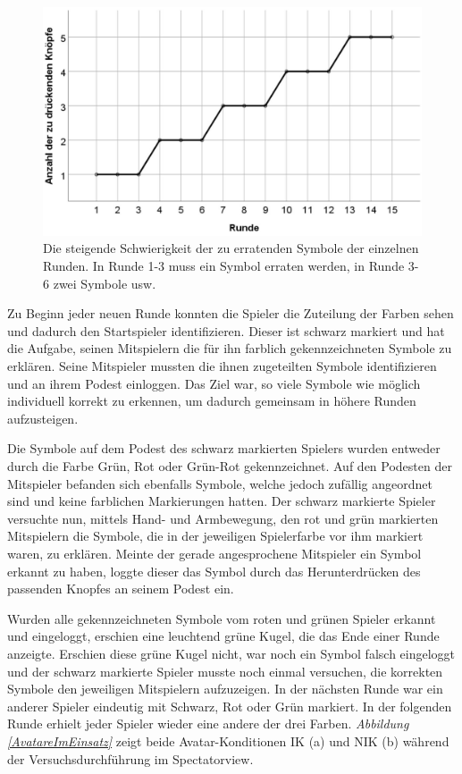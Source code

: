 \documentclass[sigchi]{acmart}
\begin{document}
\begin{figure}[H]
		\begin{footnotesize}
		\centering
			\includegraphics[width=0.7\linewidth]{Abbildungen/RoundDifficulty.JPG}	
			\caption[Der Schwierigkeitsgrad der Runden]{Die steigende Schwierigkeit der zu erratenden Symbole der einzelnen Runden. In Runde 1-3 muss ein Symbol erraten werden, in Runde 3-6 zwei Symbole usw.}
			\label{RoundDifficulty}
		\end{footnotesize}
	\end{figure}

Zu Beginn jeder neuen Runde konnten die Spieler die Zuteilung der Farben sehen und dadurch den Startspieler identifizieren. Dieser ist schwarz markiert und hat die Aufgabe, seinen Mitspielern die für ihn farblich gekennzeichneten Symbole zu erklären. Seine Mitspieler mussten die ihnen zugeteilten Symbole identifizieren und an ihrem Podest einloggen. Das Ziel war, so viele Symbole wie möglich individuell korrekt zu erkennen, um dadurch gemeinsam in höhere Runden aufzusteigen.

Die Symbole auf dem Podest des schwarz markierten Spielers wurden entweder durch die Farbe Grün, Rot oder Grün-Rot gekennzeichnet. Auf den Podesten der Mitspieler befanden sich ebenfalls Symbole, welche jedoch zufällig angeordnet sind und keine farblichen Markierungen hatten. Der schwarz markierte Spieler versuchte nun, mittels Hand- und Armbewegung, den rot und grün markierten Mitspielern die Symbole, die in der jeweiligen Spielerfarbe vor ihm markiert waren, zu erklären. Meinte der gerade angesprochene Mitspieler ein Symbol erkannt zu haben, loggte dieser das Symbol durch das Herunterdrücken des passenden Knopfes an seinem Podest ein. 

Wurden alle gekennzeichneten Symbole vom roten und grünen Spieler erkannt und eingeloggt, erschien eine leuchtend grüne Kugel, die das Ende einer Runde anzeigte. Erschien diese grüne Kugel nicht, war noch ein Symbol falsch eingeloggt und der schwarz markierte Spieler musste noch einmal versuchen, die korrekten Symbole den jeweiligen Mitspielern aufzuzeigen. 
In der nächsten Runde war ein anderer Spieler eindeutig mit Schwarz, Rot oder Grün markiert.
In der folgenden Runde erhielt jeder Spieler wieder eine andere der drei Farben.
\textit{Abbildung \ref{AvatareImEinsatz}} zeigt beide Avatar-Konditionen IK (a) und NIK (b) während der Versuchsdurchführung im Spectatorview.
	
\end{document}
